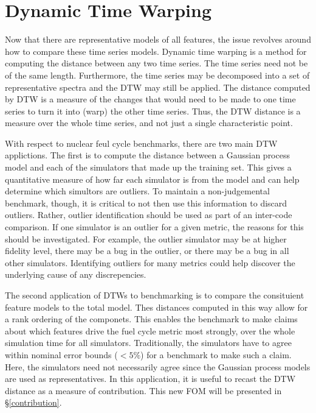 \clearpage
\section{Dynamic Time Warping}
\label{dtw}

Now that there are representative models of all features, the issue revolves 
around how to compare these time series models. Dynamic time warping \cite{muller}
is a method for computing the distance between any two time series. The time 
series need not be of the same length.  Furthermore, the time series may be 
decomposed into a set of representative spectra and the DTW may still be applied.
The distance computed by DTW is a measure of the changes that would need to be 
made to one time series to turn it into (warp) the other time series. Thus, 
the DTW distance is a measure over the whole time series, and not just a 
single characteristic point.

With respect to nuclear feul cycle benchmarks, there are two main DTW applictions.
The first is to compute the distance between a Gaussian process model and each of 
the simulators that made up the training set.  This gives a quantitative measure 
of how far each simulator is from the model and can help determine which 
simultors are outliers. To maintain a non-judgemental benchmark, though, it is 
critical to not then use this information to discard outliers.  Rather, outlier
identification should be used as part of an inter-code comparison. If one simulator
is an outlier for a given metric, the reasons for this should be investigated. 
For example, the outlier simulator may be at higher fidelity level, there may be 
a bug in the outlier, or there may be a bug in all other simulators. Identifying 
outliers for many metrics could help discover the underlying cause of any 
discrepencies.

The second application of DTWs to benchmarking is to compare the consituient 
feature models to the total model.  Thes distances computed in this way allow 
for a rank ordering of the componets.  This enables the benchmark to make claims
about which features drive the fuel cycle metric most strongly, over the whole 
simulation time for all simulators. Traditionally, the simulators have to agree
within nominal error bounds ($<5\%$) for a benchmark to make such a claim.  Here,
the simulators need not necessarily agree since the Gaussian process models are
used as representatives.  In this application, it is useful to recast the DTW 
distance as a measure of contribution.  This new FOM will be presented in 
\S\ref{contribution}.


